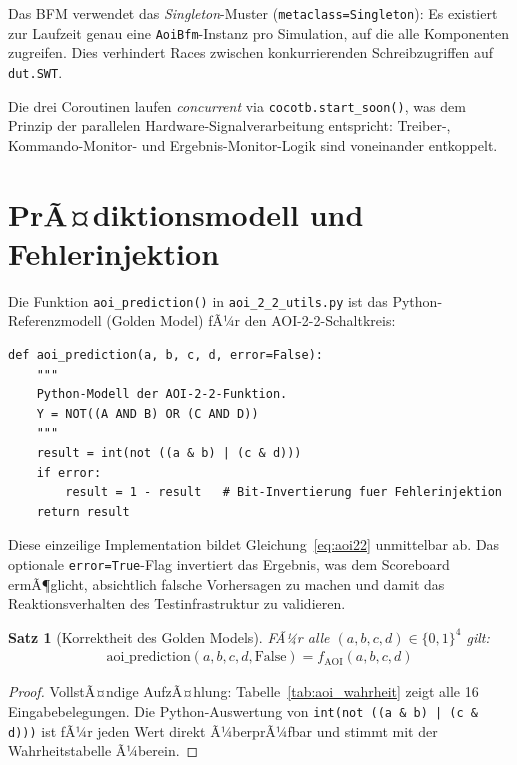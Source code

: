 ﻿\documentclass[12pt,a4paper]{report}
\newtheorem{theorem}{Satz}[section]
\begin{document}
Das BFM verwendet das \emph{Singleton}-Muster
(\texttt{metaclass=Singleton}): Es existiert zur Laufzeit genau eine
\texttt{AoiBfm}-Instanz pro Simulation, auf die alle Komponenten zugreifen.
Dies verhindert Races zwischen konkurrierenden Schreibzugriffen auf
\texttt{dut.SWT}.

Die drei Coroutinen laufen \emph{concurrent} via \texttt{cocotb.start\_soon()},
was dem Prinzip der parallelen Hardware-Signalverarbeitung entspricht: Treiber-,
Kommando-Monitor- und Ergebnis-Monitor-Logik sind voneinander entkoppelt.

\section{PrÃ¤diktionsmodell und Fehlerinjektion}
\label{subsec:praediktion}

Die Funktion \texttt{aoi\_prediction()} in \texttt{aoi\_2\_2\_utils.py} ist
das Python-Referenzmodell (Golden Model) fÃ¼r den AOI-2-2-Schaltkreis:

\begin{lstlisting}[style=pythonstyle, caption={Golden Model: \texttt{aoi\_prediction()}}]
def aoi_prediction(a, b, c, d, error=False):
    """
    Python-Modell der AOI-2-2-Funktion.
    Y = NOT((A AND B) OR (C AND D))
    """
    result = int(not ((a & b) | (c & d)))
    if error:
        result = 1 - result   # Bit-Invertierung fuer Fehlerinjektion
    return result
\end{lstlisting}

Diese einzeilige Implementation bildet Gleichung~\ref{eq:aoi22} unmittelbar
ab. Das optionale \texttt{error=True}-Flag invertiert das Ergebnis, was dem
Scoreboard ermÃ¶glicht, absichtlich falsche Vorhersagen zu machen und damit
das Reaktionsverhalten des Testinfrastruktur zu validieren.

\begin{theorem}[Korrektheit des Golden Models]
\label{thm:golden_model}
FÃ¼r alle $(a,b,c,d) \in \{0,1\}^4$ gilt:
\begin{align}
	\mathrm{aoi\_prediction}(a,b,c,d,\mathrm{False}) = f_{\mathrm{AOI}}(a,b,c,d)
\end{align}
\end{theorem}

\begin{proof}
VollstÃ¤ndige AufzÃ¤hlung: Tabelle~\ref{tab:aoi_wahrheit} zeigt alle 16
Eingabebelegungen. Die Python-Auswertung von
\texttt{int(not ((a \& b) | (c \& d)))} ist fÃ¼r jeden Wert direkt
Ã¼ber\-prÃ¼fbar und stimmt mit der Wahrheitstabelle Ã¼berein.
\end{proof}
\end{document}
